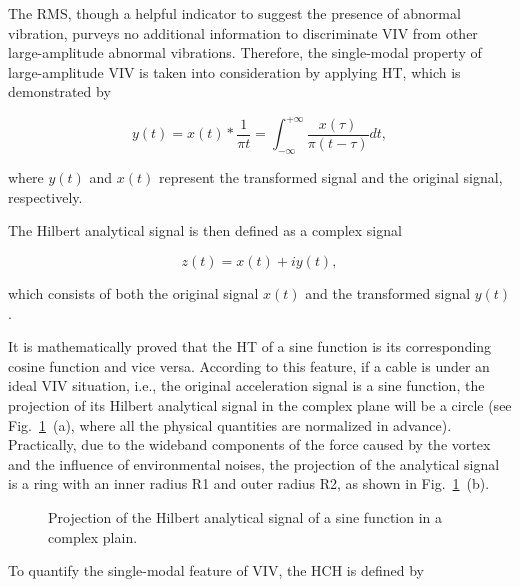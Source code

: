 \documentclass[preprint, 3p, times, compress, 11pt]{elsarticle}
\begin{document}
The RMS, though a helpful indicator to suggest the presence of abnormal 
vibration, purveys no additional information to discriminate VIV from other 
large-amplitude abnormal vibrations. Therefore, the single-modal property 
of large-amplitude VIV is taken into consideration by applying HT, 
which is demonstrated by 

\begin{equation}
    y(t) = x(t) * \frac{1}{\pi t} = \int_{-\infty}^{+\infty} 
            \frac{x(\tau)}{\pi(t-\tau)} dt, 
    \label{eq:hilb}
\end{equation}

where $y(t)$ and $x(t)$ represent the transformed signal and the 
original signal, respectively. 

The Hilbert analytical signal is then defined as a complex signal 

\begin{equation}
    z(t) = x(t) + iy(t),
    \label{eq:comp_sign}
\end{equation}

which consists of both the original 
signal $x(t)$ and the transformed signal $y(t)$. 

It is mathematically proved that the HT of a sine function is its 
corresponding cosine function and vice versa. According to this feature, 
if a cable is under an ideal VIV situation, i.e., the original acceleration 
signal is a sine function, the projection of its Hilbert analytical 
signal in the complex plane will be a circle (see Fig.~\ref{fig:proj_hilb}~(a), 
where all the physical quantities are normalized in advance). Practically, 
due to the wideband components of the force caused by the vortex and the 
influence of environmental noises, the projection of the analytical 
signal is a ring with an inner radius R1 and outer radius R2, as shown 
in Fig.~\ref{fig:proj_hilb}~(b).

\begin{figure}[ht]
    \centering
    \qquad
    \caption{Projection of the Hilbert analytical signal of a sine 
            function in a complex plain.}
    \label{fig:proj_hilb}
\end{figure}

To quantify the single-modal feature of VIV, the HCH is defined by 
\end{document}
